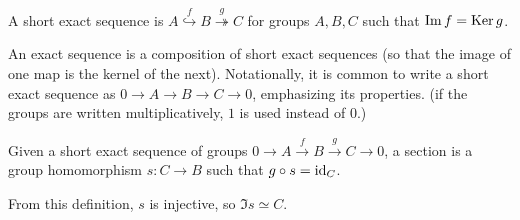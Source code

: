 \begin{defn}
A short exact sequence is $A\stackrel{f}{\hookrightarrow} B \stackrel{g}{\twoheadrightarrow} C$ for groups $A,B,C$ such that $\operatorname{Im} f = \operatorname{Ker} g$.
\end{defn}
An exact sequence is a composition of short exact sequences (so that the image of one map is the kernel of the next). Notationally, it is common to write a short exact sequence as $0\to A\to B\to C\to0$, emphasizing its properties. (if the groups are written multiplicatively, $1$ is used instead of $0$.)
\begin{defn}
Given a short exact sequence of groups $0\to A\stackrel{f}{\to} B\stackrel{g}{\to} C\to 0$, a section is a group homomorphism $s:C\to B$ such that $g\circ s = \operatorname{id}_C$.
\end{defn}
From this definition, $s$ is injective, so $\Im s\simeq C$.

